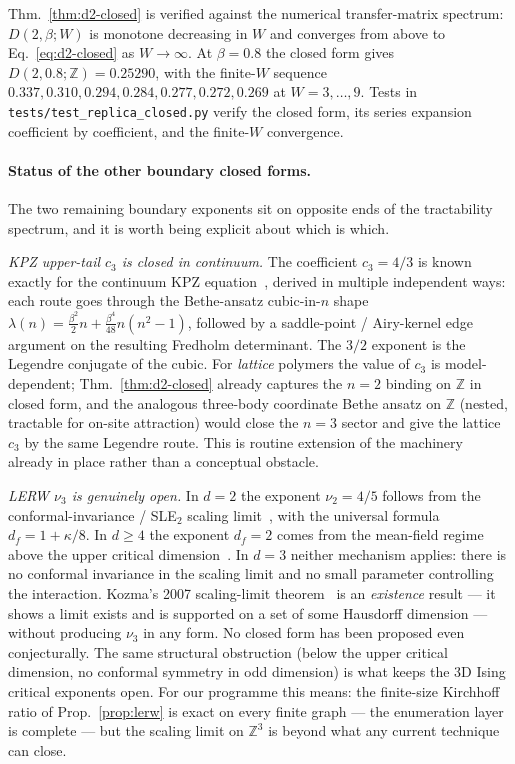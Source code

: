 \documentclass[10pt,a4paper,twocolumn]{article}
\theoremstyle{plain}
\theoremstyle{definition}
\begin{document}
Thm.~\ref{thm:d2-closed} is verified against the numerical
transfer-matrix spectrum: $D(2, \beta; W)$ is monotone decreasing
in $W$ and converges from above to Eq.~\eqref{eq:d2-closed} as
$W \to \infty$.  At $\beta = 0.8$ the closed form gives
$D(2, 0.8; \mathbb{Z}) = 0.25290$, with the finite-$W$ sequence
$0.337, 0.310, 0.294, 0.284, 0.277, 0.272, 0.269$ at
$W = 3, \dots, 9$.  Tests in
\texttt{tests/test\_replica\_closed.py} verify the closed form,
its series expansion coefficient by coefficient, and the finite-$W$
convergence.

\paragraph{Status of the other boundary closed forms.}
The two remaining boundary exponents sit on opposite ends of the
tractability spectrum, and it is worth being explicit about which
is which.

\emph{KPZ upper-tail $c_3$ is closed in continuum.}
The coefficient $c_3 = 4/3$ is known exactly for the continuum
KPZ equation~\citep{DasTsai2021, KrajenbrinkLeDoussal2021,
Tsai2022}, derived in multiple independent ways: each route goes
through the Bethe-ansatz cubic-in-$n$ shape
$\lambda(n) = \tfrac{\beta^2}{2} n + \tfrac{\beta^4}{48} n(n^2-1)$,
followed by a saddle-point / Airy-kernel edge argument on the
resulting Fredholm determinant.  The $3/2$ exponent is the
Legendre conjugate of the cubic.  For \emph{lattice} polymers the
value of $c_3$ is model-dependent; Thm.~\ref{thm:d2-closed} already
captures the $n = 2$ binding on $\mathbb{Z}$ in closed form, and the
analogous three-body coordinate Bethe ansatz on $\mathbb{Z}$
(nested, tractable for on-site attraction) would close the
$n = 3$ sector and give the lattice $c_3$ by the same Legendre
route. This is routine extension of the machinery already in
place rather than a conceptual obstacle.

\emph{LERW $\nu_3$ is genuinely open.}
In $d = 2$ the exponent $\nu_2 = 4/5$ follows from the
conformal-invariance / SLE$_2$ scaling
limit~\citep{LawlerSchrammWerner2004}, with the universal formula
$d_f = 1 + \kappa/8$.  In $d \geq 4$ the exponent $d_f = 2$ comes
from the mean-field regime above the upper critical
dimension~\citep{Lawler1986}.  In $d = 3$ neither mechanism
applies: there is no conformal invariance in the scaling limit and
no small parameter controlling the interaction.  Kozma's 2007
scaling-limit theorem~\citep{Kozma2007} is an \emph{existence}
result --- it shows a limit exists and is supported on a set of
some Hausdorff dimension --- without producing $\nu_3$ in any
form.  No closed form has been proposed even conjecturally.  The
same structural obstruction (below the upper critical dimension,
no conformal symmetry in odd dimension) is what keeps the 3D
Ising critical exponents open.  For our programme this means:
the finite-size Kirchhoff ratio of Prop.~\ref{prop:lerw} is exact
on every finite graph --- the enumeration layer is complete ---
but the scaling limit on $\mathbb{Z}^3$ is beyond what any current
technique can close.
\end{document}
